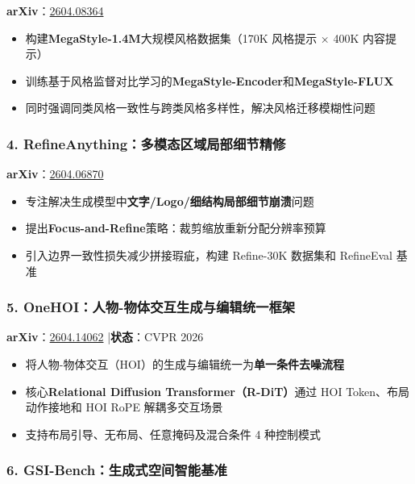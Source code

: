 \textbf{arXiv}：\href{https://arxiv.org/abs/2604.08364}{2604.08364}

\begin{itemize}[leftmargin=1.5em]
  \item 构建\textbf{MegaStyle-1.4M}大规模风格数据集（170K 风格提示 × 400K 内容提示）
  \item 训练基于风格监督对比学习的\textbf{MegaStyle-Encoder}和\textbf{MegaStyle-FLUX}
  \item 同时强调同类风格一致性与跨类风格多样性，解决风格迁移模糊性问题
\end{itemize}

\subsubsection{4. RefineAnything：多模态区域局部细节精修}

\textbf{arXiv}：\href{https://arxiv.org/abs/2604.06870}{2604.06870}

\begin{itemize}[leftmargin=1.5em]
  \item 专注解决生成模型中\textbf{文字/Logo/细结构局部细节崩溃}问题
  \item 提出\textbf{Focus-and-Refine}策略：裁剪缩放重新分配分辨率预算
  \item 引入边界一致性损失减少拼接瑕疵，构建 Refine-30K 数据集和 RefineEval 基准
\end{itemize}

\subsubsection{5. OneHOI：人物-物体交互生成与编辑统一框架}

\textbf{arXiv}：\href{https://arxiv.org/abs/2604.14062}{2604.14062} |\textbf{状态}：CVPR 2026

\begin{itemize}[leftmargin=1.5em]
  \item 将人物-物体交互（HOI）的生成与编辑统一为\textbf{单一条件去噪流程}
  \item 核心\textbf{Relational Diffusion Transformer（R-DiT）}通过 HOI Token、布局动作接地和 HOI RoPE 解耦多交互场景
  \item 支持布局引导、无布局、任意掩码及混合条件 4 种控制模式
\end{itemize}

\subsubsection{6. GSI-Bench：生成式空间智能基准}

